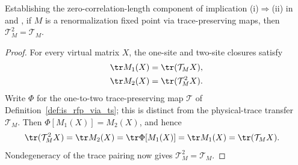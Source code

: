\begin{theorem}
    \label{thm:rfp_via_ts_physical_trace_idempotent}
    \leanok
    Establishing the zero-correlation-length component of implication
    (i)$\Rightarrow$(ii) in
    \cite[Theorem~4.9, lines~851--893]{Cirac2016MPDO_arXiv} and
    \cite[Appendix~C, lines~1333--1340]{Cirac2016MPDO_arXiv}, if $M$ is a
    renormalization fixed point via trace-preserving maps, then
    $\mathcal T_M^2=\mathcal T_M$.
\end{theorem}

\begin{proof}
    \leanok
    For every virtual matrix $X$, the one-site and two-site closures satisfy
    \begin{align}
        \tr M_1(X) & =\tr(\mathcal T_M X),
        \notag                               \\
        \tr M_2(X) & =\tr(\mathcal T_M^2 X).
        \notag
    \end{align}
    Write $\Phi$ for the one-to-two trace-preserving map $\mathcal T$ of
    Definition~\ref{def:is_rfp_via_ts}; this is distinct from the
    physical-trace transfer $\mathcal T_M$. Then
    $\Phi[M_1(X)]=M_2(X)$, and hence
    \begin{align}
        \tr(\mathcal T_M^2 X)
         & =\tr M_2(X)
        =\tr\Phi[M_1(X)]
        =\tr M_1(X)
        =\tr(\mathcal T_M X).
        \notag
    \end{align}
    Nondegeneracy of the trace pairing now gives
    $\mathcal T_M^2=\mathcal T_M$.
\end{proof}

